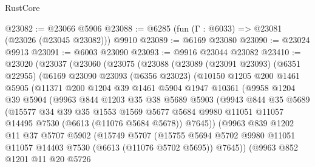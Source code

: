 \begin{lexlean}{RustCore}
\begin{coremodule}
@23082 := @23066 @5906
@23088 := @6285 (fun (Γ : @6033) => @23081 (@23026 (@23045 @23082))) @9910
@23089 := @6169 @23080
@23090 := @23024 @9913
@23091 := @6003 @23090
@23093 := @9916 @23044 @23082
@23410 := @23020
    (@23037
      (@23060
        (@23075
          (@23088
            (@23089
              (@23091 @23093)
              (@6351 @22955)
              (@6169
                @23090
                @23093
                (@6356 @23023)
                (@10150
                  @1205
                  @200
                  @1461
                  @5905
                  (@11371
                    @200
                    @1204
                    @39
                    @1461
                    @5904
                    @1947
                    @10361
                    (@9958
                      @1204
                      @39
                      @5904
                      (@9963
                        @844
                        @1203
                        @35
                        @38
                        @5689
                        @5903
                        (@9943
                          @844
                          @35
                          @5689
                          (@15577
                            @34
                            @39
                            @35
                            @1553
                            @1569
                            @5677
                            @5684
                            @9980
                            @11051
                            @11057
                            @14495
                            @7530
                            (@6613 (@11076 @5684 @5678))
                            @7645))
                        (@9963
                          @839
                          @1202
                          @11
                          @37
                          @5707
                          @5902
                          (@15749
                            @5707
                            (@15755
                              @5694
                              @5702
                              @9980
                              @11051
                              @11057
                              @14403
                              @7530
                              (@6613 (@11076 @5702 @5695))
                              @7645))
                          (@9963
                            @852
                            @1201
                            @11
                            @20
                            @5726

\end{coremodule}
\end{lexlean}
